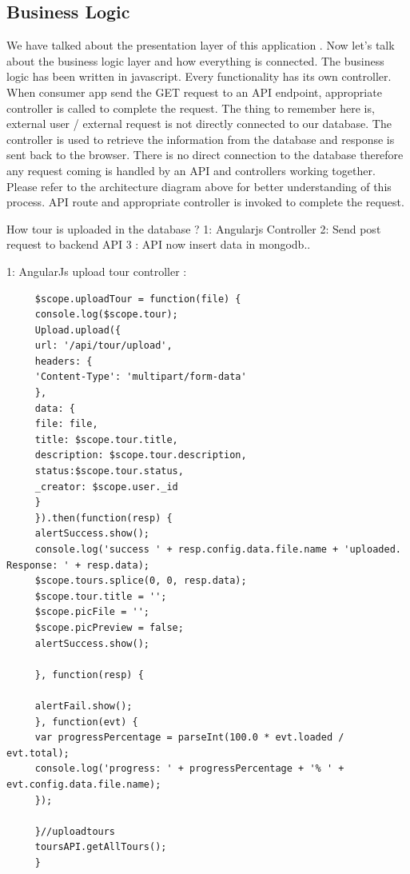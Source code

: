 		\subsection{Business Logic }
		We have talked about the presentation layer of this application . Now let's talk about the business logic layer and how everything is connected.  The business logic has been written in javascript. Every functionality has its own controller.  When consumer app send the GET request to an API endpoint, appropriate controller is called to complete the request. The thing to remember here is, external user / external request is not directly connected to our database. The controller is used to retrieve the information from the database and response is sent back to the browser. There is no direct connection to the database therefore any request coming is handled by an API and controllers working together.  Please refer to the architecture diagram above for better understanding of this process. 
		API route and appropriate controller is invoked to complete the request. 
		
		How tour is uploaded in the database ?
		1: Angularjs Controller
		2: Send post request to backend API
		3 : API  now insert data in mongodb..
		
		
		1: AngularJs upload tour controller :
		
\begin{verbatim}
	 $scope.uploadTour = function(file) {
	 console.log($scope.tour);
	 Upload.upload({
	 url: '/api/tour/upload',
	 headers: {
	 'Content-Type': 'multipart/form-data'
	 },
	 data: {
	 file: file,
	 title: $scope.tour.title,
	 description: $scope.tour.description,
	 status:$scope.tour.status,
	 _creator: $scope.user._id
	 }
	 }).then(function(resp) {
	 alertSuccess.show();
	 console.log('success ' + resp.config.data.file.name + 'uploaded. Response: ' + resp.data);
	 $scope.tours.splice(0, 0, resp.data);
	 $scope.tour.title = '';
	 $scope.picFile = '';
	 $scope.picPreview = false;
	 alertSuccess.show();
	 
	 }, function(resp) {
	 
	 alertFail.show();
	 }, function(evt) {
	 var progressPercentage = parseInt(100.0 * evt.loaded / evt.total);
	 console.log('progress: ' + progressPercentage + '% ' + evt.config.data.file.name);
	 });
	 
	 }//uploadtours
	 toursAPI.getAllTours();
	 }
\end{verbatim}
		
		
		
		
		

